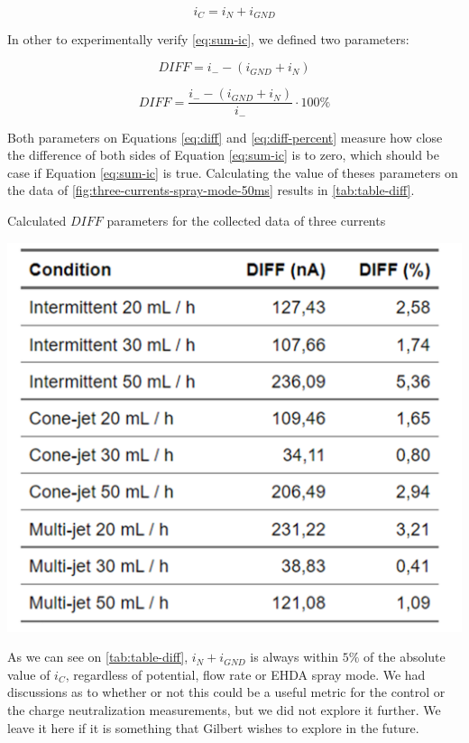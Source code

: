 \documentclass[oneside,12pt]{article}
\begin{document}
\begin{equation} \label{eq:sum-ic}
    i_C = i_N + i_{GND}
\end{equation}

In other to experimentally verify \autoref{eq:sum-ic}, we defined two parameters:

\begin{equation} \label{eq:diff}
    DIFF = i_- - \left(i_{GND} + i_N\right)
\end{equation}

\begin{equation} \label{eq:diff-percent}
    DIFF = \frac{i_- - \left(i_{GND} + i_N\right)}{i_-} \cdot 100\%
\end{equation}

Both parameters on Equations \ref{eq:diff} and \ref{eq:diff-percent} measure how close the difference of both
sides of Equation \ref{eq:sum-ic} is to zero,
which should be case if Equation \ref{eq:sum-ic} is true. Calculating the value of theses parameters on the data of \autoref{fig:three-currents-spray-mode-50ms}
results in \autoref{tab:table-diff}.

\begin{table}[h!]
    \begin{center}
        \caption{Calculated $DIFF$ parameters for the collected data of three currents}
        \includegraphics[width=.6\textwidth,trim=1 1 1 1,clip]{figures/table-diff.png}
        \label{tab:table-diff}
    \end{center}
  \end{table}

As we can see on \autoref{tab:table-diff}, $i_N + i_{GND}$ is always within $5\%$ of the absolute value of $i_C$, regardless of potential,
flow rate or EHDA spray mode. We had discussions as to whether 
or not this could be a useful metric for the control or the charge neutralization measurements, but we did not explore it further. We leave it here 
if it is something that Gilbert wishes to explore in the future. 
\end{document}
